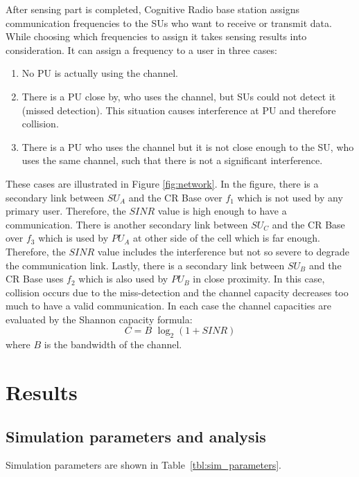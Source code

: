 \documentclass[conference,compsoc]{IEEEtran}
\newcommand{\CR}{Cognitive Radio }
\begin{document}
After sensing part is completed, \CR base station assigns communication frequencies to the SUs who want to receive or transmit data. While choosing which frequencies to assign it takes sensing results into consideration. It can assign a frequency to a user in three cases:
\begin{enumerate}
\item No PU is actually using the channel.
\item There is a PU close by, who uses the channel, but SUs could not detect it (missed detection). This
      situation causes interference at PU and therefore collision.
\item There is a PU who uses the channel but it is not close enough to the SU, who uses the same channel,
      such that there is not a significant interference.
\end{enumerate}

These cases are illustrated in Figure \ref{fig:network}. In the figure, there is a secondary link between $SU_A$ and the CR Base over $f_1$ which is not used by any primary user. Therefore, the $SINR$ value is high enough to have a communication. There is another secondary link between $SU_C$ and the CR Base over $f_3$ which is used by $PU_A$ at other side of the cell which is far enough. Therefore, the $SINR$ value includes the interference but not so severe to degrade the communication link. Lastly, there is a secondary link between $SU_B$ and the CR Base uses $f_2$ which is also used by $PU_B$ in close proximity. In this case, collision occurs due to the miss-detection and the channel capacity decreases too much to have a valid communication. In each case the channel capacities are evaluated by the Shannon capacity formula:
\begin{equation}
    C = B\,\, \log_2(1+SINR)
\end{equation}
where $B$ is the bandwidth of the channel.

\section{\label{sec:results}Results}
\subsection{Simulation parameters and analysis}
Simulation parameters are shown in Table~\ref{tbl:sim_parameters}.
\end{document}
